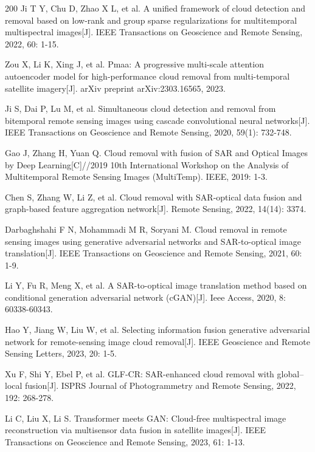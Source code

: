 \begin{thebibliography}{200}
Ji T Y, Chu D, Zhao X L, et al. A unified framework of cloud detection and removal based on low-rank and group sparse regularizations for multitemporal multispectral images[J]. IEEE Transactions on Geoscience and Remote Sensing, 2022, 60: 1-15.

Zou X, Li K, Xing J, et al. Pmaa: A progressive multi-scale attention autoencoder model for high-performance cloud removal from multi-temporal satellite imagery[J]. arXiv preprint arXiv:2303.16565, 2023.

Ji S, Dai P, Lu M, et al. Simultaneous cloud detection and removal from bitemporal remote sensing images using cascade convolutional neural networks[J]. IEEE Transactions on Geoscience and Remote Sensing, 2020, 59(1): 732-748.

Gao J, Zhang H, Yuan Q. Cloud removal with fusion of SAR and Optical Images by Deep Learning[C]//2019 10th International Workshop on the Analysis of Multitemporal Remote Sensing Images (MultiTemp). IEEE, 2019: 1-3.

Chen S, Zhang W, Li Z, et al. Cloud removal with SAR-optical data fusion and graph-based feature aggregation network[J]. Remote Sensing, 2022, 14(14): 3374.

Darbaghshahi F N, Mohammadi M R, Soryani M. Cloud removal in remote sensing images using generative adversarial networks and SAR-to-optical image translation[J]. IEEE Transactions on Geoscience and Remote Sensing, 2021, 60: 1-9.

Li Y, Fu R, Meng X, et al. A SAR-to-optical image translation method based on conditional generation adversarial network (cGAN)[J]. Ieee Access, 2020, 8: 60338-60343.

% 
Hao Y, Jiang W, Liu W, et al. Selecting information fusion generative adversarial network for remote-sensing image cloud removal[J]. IEEE Geoscience and Remote Sensing Letters, 2023, 20: 1-5.


% 
Xu F, Shi Y, Ebel P, et al. GLF-CR: SAR-enhanced cloud removal with global–local fusion[J]. ISPRS Journal of Photogrammetry and Remote Sensing, 2022, 192: 268-278.

% 
Li C, Liu X, Li S. Transformer meets GAN: Cloud-free multispectral image reconstruction via multisensor data fusion in satellite images[J]. IEEE Transactions on Geoscience and Remote Sensing, 2023, 61: 1-13.


\end{thebibliography}
